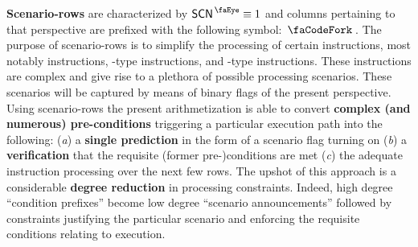 \textbf{Scenario-rows} are characterized by $\peekScenario \equiv 1$ and columns pertaining to that perspective are prefixed with the following symbol: $\scenarioSignifier$. 
The purpose of scenario-rows is to simplify the processing of certain instructions, most notably
 instructions,
-type instructions, and
-type instructions.
These instructions are complex and give rise to a plethora of possible processing scenarios.
These scenarios will be captured by means of binary flags of the present perspective.
Using scenario-rows the present arithmetization is able to convert \textbf{complex (and numerous) pre-conditions} triggering a particular execution path into the following:
(\emph{a})
a \textbf{single prediction} in the form of a scenario flag turning on
(\emph{b})
a \textbf{verification} that the requisite (former pre-)conditions are met
(\emph{c})
the adequate instruction processing over the next few rows.
The upshot of this approach is a considerable \textbf{degree reduction} in processing constraints.
Indeed, high degree ``condition prefixes'' become low degree ``scenario announcements'' followed by constraints justifying the particular scenario and enforcing the requisite conditions relating to execution. 
